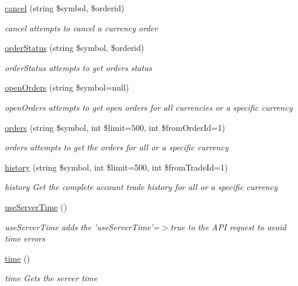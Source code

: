 \begin{DoxyCompactItemize}
\hyperlink{classBinance_1_1API_ac49c3595190e193510eb368c0fa92992}{cancel} (string \$symbol, \$orderid)
\begin{DoxyCompactList}\small\item\em cancel attempts to cancel a currency order \end{DoxyCompactList}\item 
\hyperlink{classBinance_1_1API_ae7eae3f9588c2aee0d3c46bb9fa2ffe4}{order\-Status} (string \$symbol, \$orderid)
\begin{DoxyCompactList}\small\item\em order\-Status attempts to get orders status \end{DoxyCompactList}\item 
\hyperlink{classBinance_1_1API_a155a0a0d36ea7145f5833d9f17386335}{open\-Orders} (string \$symbol=null)
\begin{DoxyCompactList}\small\item\em open\-Orders attempts to get open orders for all currencies or a specific currency \end{DoxyCompactList}\item 
\hyperlink{classBinance_1_1API_aa1b445b6eb144e0c551fbe035737dbf8}{orders} (string \$symbol, int \$limit=500, int \$from\-Order\-Id=1)
\begin{DoxyCompactList}\small\item\em orders attempts to get the orders for all or a specific currency \end{DoxyCompactList}\item 
\hyperlink{classBinance_1_1API_a433da4ce62d8acc2a5a501b98215a4e8}{history} (string \$symbol, int \$limit=500, int \$from\-Trade\-Id=1)
\begin{DoxyCompactList}\small\item\em history Get the complete account trade history for all or a specific currency \end{DoxyCompactList}\item 
\hyperlink{classBinance_1_1API_abcc2a5c9ca76dd659db43aec7a0a9a5f}{use\-Server\-Time} ()
\begin{DoxyCompactList}\small\item\em use\-Server\-Time adds the 'use\-Server\-Time'=$>$true to the A\-P\-I request to avoid time errors \end{DoxyCompactList}\item 
\hyperlink{classBinance_1_1API_afd72d19a5504b1a0a694ca9a8af1047b}{time} ()
\begin{DoxyCompactList}\small\item\em time Gets the server time \end{DoxyCompactList}\item 

\end{DoxyCompactItemize}
